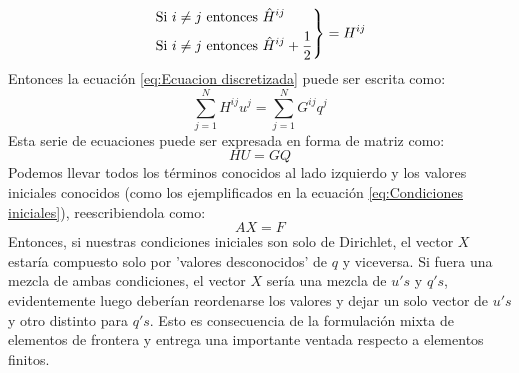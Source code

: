 \begin{equation*}
\label{eq:Desarrollo de H}
\left.
\begin{aligned}
\textnormal{Si }i\not = j&\textnormal{ entonces } \hat{H}^{ij}\\
\textnormal{Si }i\not = j&\textnormal{ entonces } \hat{H}^{ij}+\frac{1}{2}
\end{aligned}
\right\}
=H^{ij}
\end{equation*}
Entonces la ecuación \eqref{eq:Ecuacion discretizada} puede ser escrita como:
\begin{equation}
\label{eq:Sumatoria de H y G}
\sum_{j=1}^NH^{ij}u^j=\sum_{j=1}^N G^{ij}q^j
\end{equation}
Esta serie de ecuaciones puede ser expresada en forma de matriz como:
\begin{equation}
\label{eq:Forma matricial HU=GQ}
HU=GQ
\end{equation}
Podemos llevar todos los términos conocidos al lado izquierdo y los valores iniciales conocidos (como los ejemplificados en la ecuación \eqref{eq:Condiciones iniciales}), reescribiendola como:
\begin{equation}
\label{eq:Forma matricial AX=F}
AX=F
\end{equation}
Entonces, si nuestras condiciones iniciales son solo de Dirichlet, el vector $X$ estaría compuesto solo por 'valores desconocidos' de $q$ y viceversa. Si fuera una mezcla de ambas condiciones, el vector $X$ sería una mezcla de $u's$ y $q's$, evidentemente luego deberían reordenarse los valores y dejar un solo vector de $u's$ y otro distinto para $q's$. Esto es consecuencia de la formulación mixta de elementos de frontera y entrega una importante ventada respecto a elementos finitos.
